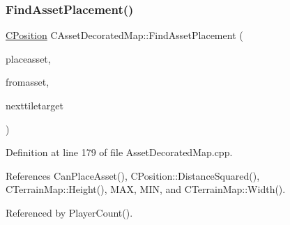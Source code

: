 \subsubsection{\texorpdfstring{Find\+Asset\+Placement()}{FindAssetPlacement()}}
{\footnotesize\ttfamily \hyperlink{classCPosition}{C\+Position} C\+Asset\+Decorated\+Map\+::\+Find\+Asset\+Placement (\begin{DoxyParamCaption}\item[{std\+::shared\+\_\+ptr$<$ \hyperlink{classCPlayerAsset}{C\+Player\+Asset} $>$}]{placeasset,  }\item[{std\+::shared\+\_\+ptr$<$ \hyperlink{classCPlayerAsset}{C\+Player\+Asset} $>$}]{fromasset,  }\item[{const \hyperlink{classCPosition}{C\+Position} \&}]{nexttiletarget }\end{DoxyParamCaption})}



Definition at line 179 of file Asset\+Decorated\+Map.\+cpp.



References Can\+Place\+Asset(), C\+Position\+::\+Distance\+Squared(), C\+Terrain\+Map\+::\+Height(), M\+AX, M\+IN, and C\+Terrain\+Map\+::\+Width().



Referenced by Player\+Count().


